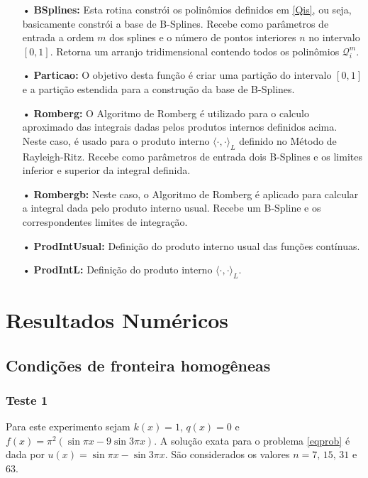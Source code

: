 \documentclass[12pt,a4paper]{report}
\begin{document}
\begin{itemize}
\item[•] \textbf{BSplines:} Esta rotina constrói os polinômios definidos em \eqref{Qis}, ou seja, basicamente constrói a base de B-Splines. Recebe como parâmetros de entrada a ordem $m$ dos splines e o número de pontos interiores $n$ no intervalo $[0,1]$. Retorna um arranjo tridimensional contendo todos os polinômios $\mathcal{Q}_i^m$.

\item[•] \textbf{Particao:} O objetivo desta função é criar uma partição do intervalo $[0,1]$ e a partição estendida para a construção da base de B-Splines.

\item[•] \textbf{Romberg:} O Algoritmo de Romberg é utilizado para o calculo aproximado das integrais dadas pelos produtos internos definidos acima. Neste caso, é usado para o produto interno $\langle \cdot,\cdot\rangle _L$ definido no Método de Rayleigh-Ritz. Recebe como parâmetros de entrada dois B-Splines e os limites inferior e superior da integral definida. 

\item[•] \textbf{Rombergb:} Neste caso, o Algoritmo de Romberg é aplicado para calcular a integral dada pelo produto interno usual. Recebe um B-Spline e os correspondentes limites de integração.

\item[•] \textbf{ProdIntUsual:} Definição do produto interno usual das funções contínuas.

\item[•] \textbf{ProdIntL:} Definição do produto interno $\langle \cdot,\cdot\rangle _L$.
\end{itemize}

\section*{Resultados Numéricos}
\subsection*{Condições de fronteira homogêneas}
\subsubsection*{Teste 1} Para este experimento sejam $k(x)=1$, $q(x)=0$ e $f(x)=\pi^2(\sin \pi x - 9\sin 3\pi x )$. A solução exata para o problema \eqref{eqprob} é dada por $u(x)=\sin\pi x -\sin 3\pi x$. São considerados os valores $n=7,\, 15,\, 31$ e 63.
\end{document}
